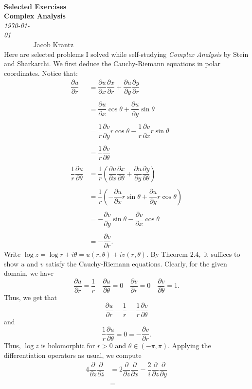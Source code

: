 \documentclass[12pt]{article}
\newenvironment{statement}[1]{\smallskip\noindent\color{black}{\bf #1.}}{}
\theoremstyle{definition}
\theoremstyle{remark}
\newcommand{\p}{\partial}
\begin{document}
{\noindent\Huge\bf  \\[0.5\baselineskip] {\selectfont  Selected Exercises}         }\\[1\baselineskip] %
{ {\bf {}\selectfont Complex Analysis}\\ {\textit{\selectfont     \today}}}~~~~~~~~~~~~~~~~~~~~~~~~~~~~~~~~~~~~~~~~~~~~~~~~~~~~~~~~~~~~~~~~~~~~~~~~~~~~~    {\large{Jacob Krantz}}
\noindent\makebox[\linewidth]{\rule{8in}{0.4pt}}
\\[1.4\baselineskip]
Here are selected problems I solved while self-studying \textit{Complex Analysis} by Stein and Sharkarchi.
\begin{statement}{1.9}
We first deduce the Cauchy-Riemann equations in polar coordinates. Notice that:
\begin{align*}
\dfrac{\p u}{\p r} &= \dfrac{\p u}{\p x}\dfrac{\p x}{\p r} + \dfrac{\p u}{\p y}\dfrac{\p y}{\p r} \\\\
&= \dfrac{\p u}{\p x}\cos\theta + \dfrac{\p u}{\p y}\sin\theta \\\\
&= \dfrac{1}{r}\dfrac{\p v}{\p y}r\cos\theta - \dfrac{1}{r}\dfrac{\p v}{\p x}r\sin\theta \\\\
&= \dfrac{1}{r}\dfrac{\p v}{\p \theta} \\\\
\dfrac{1}{r}\dfrac{\p u}{\p \theta} &= \dfrac{1}{r}\left (\dfrac{\p u}{\p x}\dfrac{\p x}{\p \theta} + \dfrac{\p u}{\p y}\dfrac{\p y}{\p \theta}\right ) \\\\
&= \dfrac{1}{r}\left (-\dfrac{\p u}{\p x}r\sin\theta + \dfrac{\p u}{\p y}r\cos\theta\right ) \\\\
&= -\dfrac{\p v}{\p y}\sin\theta - \dfrac{\p v}{\p x}\cos\theta \\\\
&= -\dfrac{\p v}{\p r}.
\end{align*}
Write $\log z = \log r + i\theta = u(r,\theta) + iv(r,\theta).$ By Theorem $2.4,$ it suffices to show $u$ and $v$ satisfy the Cauchy-Riemann equations. Clearly, for the given domain, we have
\[\dfrac{\p u}{\p r} = \dfrac{1}{r} \quad \dfrac{\p u}{\p \theta} = 0 \quad \dfrac{\p v}{\p r} = 0 \quad \dfrac{\p v}{\p \theta} = 1.\]
Thus, we get that
\[\dfrac{\p u}{\p r} = \dfrac{1}{r} = \dfrac{1}{r}\dfrac{\p v}{\p \theta}\]
and
\[\dfrac{1}{r}\dfrac{\p u}{\p \theta} = 0 = -\dfrac{\p v}{\p r}.\]
Thus, $\log z$ is holomorphic for $r > 0$ and $\theta \in (-\pi,\pi).$
\end{statement}
\begin{statement}{1.10}
Applying the differentiation operators as usual, we compute
\begin{align*}
4\dfrac{\p}{\p z}\dfrac{\p}{\p\overline{z}} &= 2\dfrac{\p}{\p z}\dfrac{\p}{\p x} - \dfrac{2}{i}\dfrac{\p}{\p z}\dfrac{\p}{\p y} \\\\
&=  
\end{align*}
\end{statement}
\end{document}
